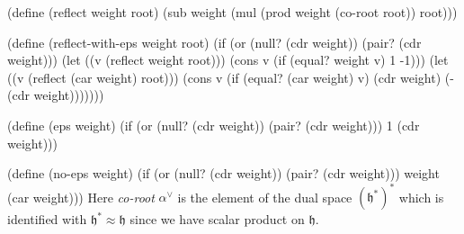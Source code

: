 \documentclass[a4paper,10pt]{article}%
\theoremstyle{definition} \newtheorem{Def}{Definition}
\begin{document}
(define (reflect weight root)
  (sub weight (mul (prod weight (co-root root)) root)))

(define (reflect-with-eps weight root)
  (if (or (null? (cdr weight))
          (pair? (cdr weight)))
      (let ((v (reflect weight root)))
        (cons v (if (equal? weight v) 1 -1)))
      (let ((v (reflect (car weight) root)))
        (cons v (if (equal? (car weight) v) (cdr weight) (- (cdr weight)))))))

(define (eps weight)
  (if (or (null? (cdr weight))
          (pair? (cdr weight)))
      1
      (cdr weight)))

(define (no-eps weight)
  (if (or (null? (cdr weight))
          (pair? (cdr weight)))
      weight
      (car weight)))
\nwendcode{}\nwdocspar
Here {\it co-root} $\alpha^{\vee}$ is the element of the dual space $(\mathfrak{h}^*)^*$ which is identified with $\mathfrak{h}^*\approx \mathfrak{h}$ since we have scalar product on $\mathfrak{h}$.
\end{document}
